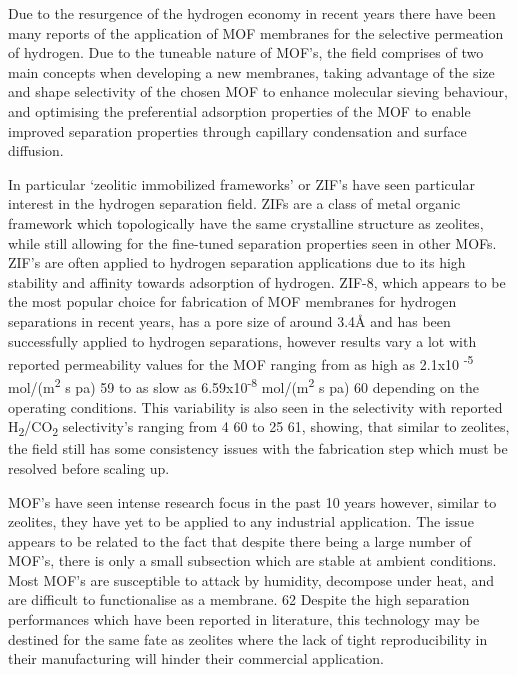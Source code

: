 Due to the resurgence of the hydrogen economy in recent years there have been many reports of 
the application of MOF membranes for the selective permeation of hydrogen. Due to the tuneable 
nature of MOF’s, the field comprises of two main concepts when developing a new membranes, 
taking advantage of the size and shape selectivity of the chosen MOF to enhance molecular 
sieving behaviour, and optimising the preferential adsorption properties of the MOF to enable 
improved separation properties through capillary condensation and surface diffusion. 

In particular ‘zeolitic immobilized frameworks’ or ZIF’s have seen particular interest in the 
hydrogen separation field. ZIFs are a class of metal organic framework which topologically 
have the same crystalline structure as zeolites, while still allowing for the fine-tuned 
separation properties seen in other MOFs. ZIF’s are often applied to hydrogen separation 
applications due to its high stability and affinity towards adsorption of hydrogen. ZIF-8, 
which appears to be the most popular choice for fabrication of MOF membranes for hydrogen 
separations in recent years, has a pore size of around 3.4Å and has been successfully applied 
to hydrogen separations, however results vary a lot with reported permeability values for the 
MOF ranging from as high as 2.1x10 \textsuperscript{-5} mol/(m\textsuperscript{2} s pa) 59 
to as slow as 6.59x10\textsuperscript{-8} mol/(m\textsuperscript{2} s pa) 60 depending on the 
operating conditions. This variability is also seen in the selectivity with reported 
H\textsubscript{2}/CO\textsubscript{2} 
selectivity’s ranging from 4 60 to 25 61, showing, that similar to zeolites, the field still 
has some consistency issues with the fabrication step which must be resolved before scaling 
up. 

MOF’s have seen intense research focus in the past 10 years however, similar to zeolites, 
they have yet to be applied to any industrial application.  The issue appears to be related 
to the fact that despite there being a large number of MOF’s, there is only a small subsection 
which are stable at ambient conditions. Most MOF’s are susceptible to attack by humidity, 
decompose under heat, and are difficult to functionalise as a membrane.  62 Despite the high 
separation performances which have been reported in literature, this technology may be 
destined for the same fate as zeolites where the lack of tight reproducibility in their 
manufacturing will hinder their commercial application. 

